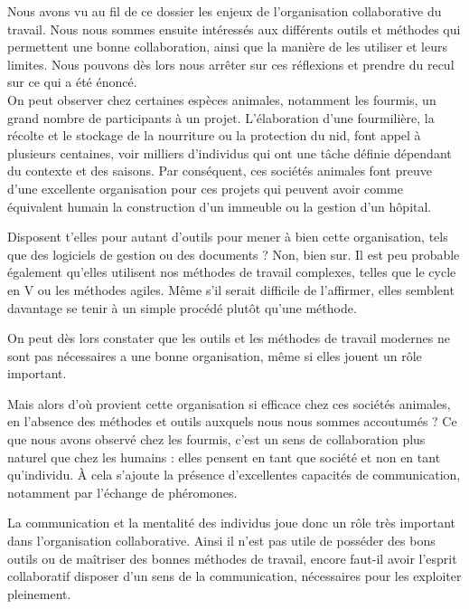 
Nous avons vu au fil de ce dossier les enjeux de l'organisation collaborative du travail. Nous nous sommes ensuite intéressés aux différents outils et méthodes qui permettent une bonne collaboration, ainsi que la manière de les utiliser et leurs limites. Nous pouvons dès lors nous arrêter sur ces réflexions et prendre du recul sur ce qui a été énoncé.\\

On peut observer chez certaines espèces animales, notamment les fourmis, un grand nombre de participants à un projet. L'élaboration d'une fourmilière, la récolte et le stockage de la nourriture ou la protection du nid, font appel à plusieurs centaines, voir milliers d'individus qui ont une tâche définie dépendant du contexte et des saisons. Par conséquent, ces sociétés animales font preuve d'une excellente organisation pour ces projets qui peuvent avoir comme équivalent humain la construction d'un immeuble ou la gestion d'un hôpital.

Disposent t'elles pour autant d'outils pour mener à bien cette organisation, tels que des logiciels de gestion ou des documents ? Non, bien sur. Il est peu probable également qu'elles utilisent nos méthodes de travail complexes, telles que le cycle en V ou les méthodes agiles. Même s'il serait difficile de l'affirmer, elles semblent davantage se tenir à un simple procédé plutôt qu'une méthode.

On peut dès lors constater que les outils et les méthodes de travail modernes ne sont pas nécessaires a une bonne organisation, même si elles jouent un rôle important.

Mais alors d'où provient cette organisation si efficace chez ces sociétés animales, en l'absence des méthodes et outils auxquels nous nous sommes accoutumés ? Ce que nous avons observé chez les fourmis, c'est un sens de collaboration plus naturel que chez les humains : elles pensent en tant que société et non en tant qu'individu. À cela s'ajoute la présence d'excellentes capacités de communication, notamment par l'échange de phéromones.

La communication et la mentalité des individus joue donc un rôle très important dans l'organisation collaborative. Ainsi il n'est pas utile de posséder des bons outils ou de maîtriser des bonnes méthodes de travail, encore faut-il avoir l'esprit collaboratif disposer d'un sens de la communication, nécessaires pour les exploiter pleinement.
